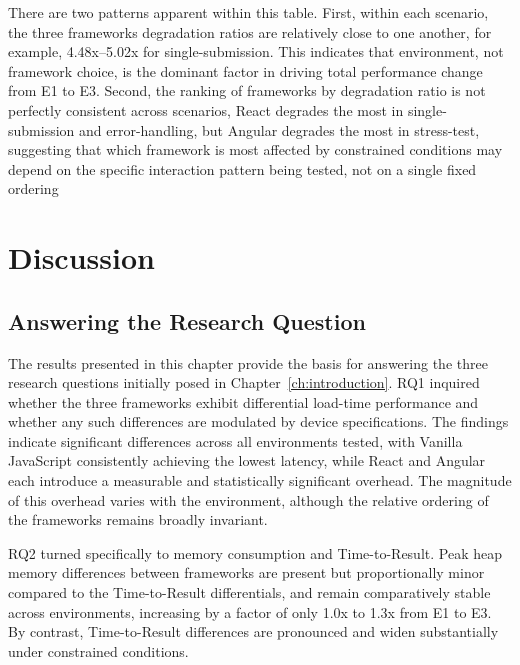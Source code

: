\documentclass[11pt,a4paper]{report}
\begin{document}
\vspace{5mm}

There are two patterns apparent within this table. First, within each scenario, the three frameworks degradation ratios are relatively close to one another, for
example, 4.48x--5.02x for single-submission. This indicates that environment, not framework choice, is the dominant factor in driving total performance change from E1 to E3. Second, the ranking of frameworks by degradation ratio is not perfectly consistent across scenarios,
React degrades the most in single-submission and error-handling, but Angular degrades the most in stress-test, suggesting that which framework is most affected by constrained conditions may depend on the specific  interaction pattern being tested, not on a single fixed ordering


\section{Discussion}

\subsection{Answering the Research Question}

\vspace{5mm}

The results presented in this chapter provide the basis for answering the three research questions initially posed in Chapter~\ref{ch:introduction}. RQ1 inquired whether the three frameworks exhibit differential load-time performance and whether any such differences are modulated by device specifications. The findings indicate significant differences across all environments tested, with Vanilla JavaScript consistently achieving the lowest latency, while React and Angular each introduce a measurable and statistically significant overhead. The magnitude of this overhead varies with the environment, although the relative ordering of the frameworks remains broadly invariant. 

\vspace{5mm}

RQ2 turned specifically to memory consumption and Time-to-Result. Peak heap memory differences between frameworks are present but proportionally minor compared to the Time-to-Result differentials, and remain comparatively stable across environments, increasing by a factor of only 1.0x to 1.3x from E1 to E3. By contrast, Time-to-Result differences are pronounced and widen substantially under constrained conditions. 
\end{document}
